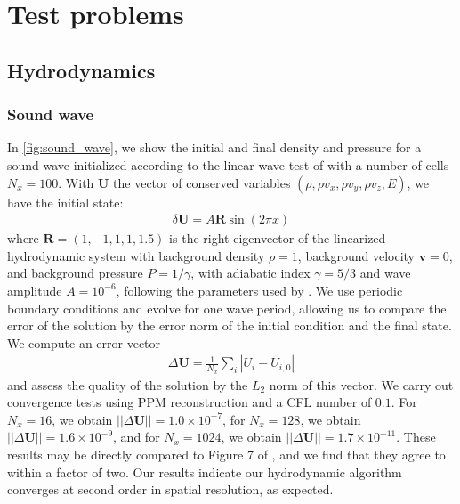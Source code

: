 \documentclass[fleqn,usenatbib]{mnras}
\newcommand{\vc}[1]{{\mathbf{#1}}}
\begin{document}
\section{Test problems}
\label{section:tests}

\subsection{Hydrodynamics}
\subsubsection{Sound wave}
In \autoref{fig:sound_wave}, we show the initial and final density and pressure for a sound wave initialized according to the linear wave test of \cite{Stone_2008} with a number of cells $N_x = 100$. With $\vc{U}$ the vector of conserved variables $(\rho, \rho v_x, \rho v_y, \rho v_z, E)$, we have the initial state:
\begin{align}
\delta \vc{U} = A \vc{R} \sin(2\pi x)
\end{align}
where $\vc{R} = (1,-1,1,1,1.5)$ is the right eigenvector of the linearized hydrodynamic system with background density $\rho = 1$, background velocity $\vc{v} = 0$, and background pressure $P = 1/\gamma$, with adiabatic index $\gamma = 5/3$ and wave amplitude $A = 10^{-6}$, following the parameters used by \cite{Stone_2008}. We use periodic boundary conditions and evolve for one wave period, allowing us to compare the error of the solution by the error norm of the initial condition and the final state. We compute an error vector
\begin{align}
\Delta \vc{U} = \frac{1}{N_x} \sum_{i} | U_i - U_{i,0} |
\end{align}
and assess the quality of the solution by the $L_2$ norm of this vector. We carry out convergence tests using PPM reconstruction and a CFL number of $0.1$. For $N_x = 16$, we obtain $||\Delta \vc{U}|| = 1.0 \times 10^{-7}$, for $N_x = 128$, we obtain $||\Delta \vc{U}|| = 1.6 \times 10^{-9}$, and for $N_x = 1024$, we obtain $||\Delta \vc{U}|| = 1.7 \times 10^{-11}$. These results may be directly compared to Figure 7 of \cite{Stone_2008}, and we find that they agree to within a factor of two. Our results indicate our hydrodynamic algorithm converges at second order in spatial resolution, as expected.
\end{document}
